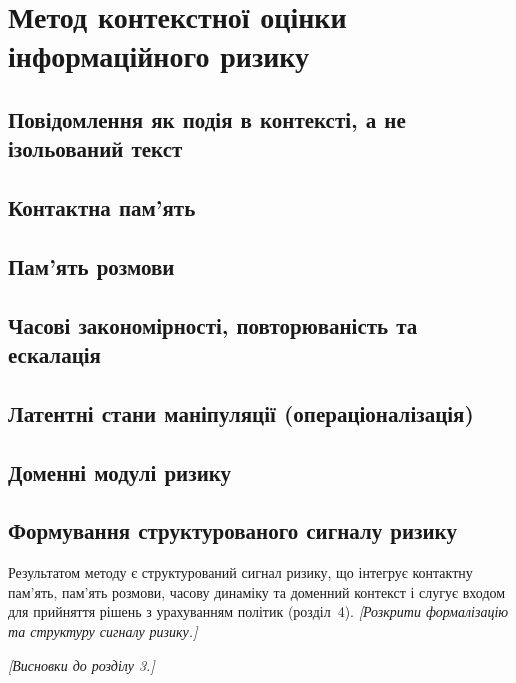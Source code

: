\chapter{Метод контекстної оцінки інформаційного ризику}
\label{ch:risk}


\section{Повідомлення як подія в контексті, а не ізольований текст}
\label{sec:event-not-text}

\section{Контактна пам'ять}
\label{sec:contact-memory}

\section{Пам'ять розмови}
\label{sec:conversation-memory}

\section{Часові закономірності, повторюваність та ескалація}
\label{sec:temporal}

\section{Латентні стани маніпуляції (операціоналізація)}
\label{sec:latent-states}

\section{Доменні модулі ризику}
\label{sec:domain-modules}

\section{Формування структурованого сигналу ризику}
\label{sec:risk-signal}
Результатом методу є структурований сигнал ризику, що інтегрує контактну пам'ять, пам'ять розмови, часову динаміку та доменний контекст і слугує входом для прийняття рішень з урахуванням політик (розділ~4). \emph{[Розкрити формалізацію та структуру сигналу ризику.]}

\emph{[Висновки до розділу 3.]}
